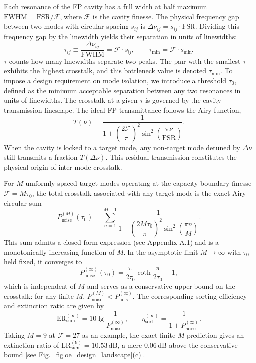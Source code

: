 \documentclass{optica-article}
\begin{document}
Each resonance of the FP cavity has a full width at half maximum $\mathrm{FWHM}=\mathrm{FSR}/\mathcal{F}$, where $\mathcal{F}$ is the cavity finesse. The physical frequency gap between two modes with circular spacing $s_{ij}$ is $\Delta\nu_{ij}=s_{ij}\cdot\mathrm{FSR}$. Dividing this frequency gap by the linewidth yields their separation in units of linewidths:
\begin{equation}
\tau_{ij}\equiv \frac{\Delta\nu_{ij}}{\mathrm{FWHM}}
=\mathcal{F}\cdot s_{ij},
\qquad
\tau_{\min}=\mathcal{F}\cdot s_{\min}.
\label{eq:oe_tau}
\end{equation}
$\tau$ counts how many linewidths separate two peaks. The pair with the smallest $\tau$ exhibits the highest crosstalk, and this bottleneck value is denoted $\tau_{\min}$.
To impose a design requirement on mode isolation, we introduce a threshold $\tau_0$, defined as the minimum acceptable separation between any two resonances in units of linewidths.
The crosstalk at a given $\tau$ is governed by the cavity transmission lineshape. The ideal FP transmittance follows the Airy function,
\begin{equation}
T(\nu)=\frac{1}{1+\left(\dfrac{2\mathcal{F}}{\pi}\right)^{\!2}
\sin^2\!\!\left(\dfrac{\pi\nu}{\mathrm{FSR}}\right)}.
\label{eq:oe_airy}
\end{equation}
When the cavity is locked to a target mode, any non-target mode detuned by $\Delta\nu$ still transmits a fraction $T(\Delta\nu)$. This residual transmission constitutes the physical origin of inter-mode crosstalk.

For $M$ uniformly spaced target modes operating at the capacity-boundary finesse $\mathcal{F}=M\tau_0$, the total crosstalk associated with any target mode is the exact Airy circular sum
\begin{equation}
P_{\mathrm{noise}}^{(M)}(\tau_0)
=\sum_{n=1}^{M-1}
\frac{1}{1+\left(\dfrac{2M\tau_0}{\pi}\right)^{\!2}
\sin^2\!\left(\dfrac{\pi n}{M}\right)}.
\label{eq:oe_pnoise_M}
\end{equation}
This sum admits a closed-form expression (see Appendix A.1) and is a monotonically increasing function of $M$. In the asymptotic limit $M\to\infty$ with $\tau_0$ held fixed, it converges to
\begin{equation}
P_{\mathrm{noise}}^{(\infty)}(\tau_0)
=\frac{\pi}{2\tau_0}\coth\!\frac{\pi}{2\tau_0}-1,
\label{eq:oe_pnoise_inf}
\end{equation}
which is independent of $M$ and serves as a conservative upper bound on the crosstalk: for any finite $M$, $P_{\mathrm{noise}}^{(M)}<P_{\mathrm{noise}}^{(\infty)}$. The corresponding sorting efficiency and extinction ratio are given by
\begin{equation}
\mathrm{ER}_{\mathrm{sum}}^{(\infty)}=10\lg\frac{1}{P_{\mathrm{noise}}^{(\infty)}},
\qquad
\eta_{\mathrm{sort}}^{(\infty)}=\frac{1}{1+P_{\mathrm{noise}}^{(\infty)}}.
\label{eq:oe_er_eta}
\end{equation}
Taking $M=9$ at $\mathcal{F}=27$ as an example, the exact finite-$M$ prediction gives an extinction ratio of $\mathrm{ER}_{\mathrm{sum}}^{(9)}=10.53\,\mathrm{dB}$, a mere $0.06\,\mathrm{dB}$ above the conservative bound [see Fig.~\ref{fig:oe_design_landscape}(c)].
\end{document}
